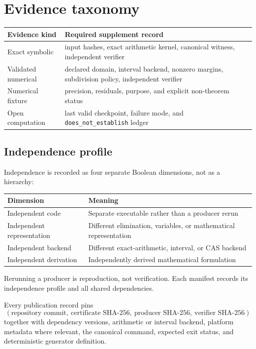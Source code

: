 \documentclass[11pt]{article}
\begin{document}
\section{Evidence taxonomy}

\begin{center}
\begin{tabularx}{0.96\textwidth}{@{}Y Y@{}}
\toprule
Evidence kind & Required supplement record\\
\midrule
Exact symbolic & input hashes, exact arithmetic kernel, canonical witness,
independent verifier\\
Validated numerical & declared domain, interval backend, nonzero margins,
subdivision policy, independent verifier\\
Numerical fixture & precision, residuals, purpose, and explicit
non-theorem status\\
Open computation & last valid checkpoint, failure mode, and
\texttt{does\_not\_establish} ledger\\
\bottomrule
\end{tabularx}
\end{center}

\subsection{Independence profile}

Independence is recorded as four separate Boolean dimensions, not as a
hierarchy:
\begin{center}
\begin{tabularx}{0.96\textwidth}{@{}p{} Y@{}}
\toprule
Dimension & Meaning\\
\midrule
Independent code & Separate executable rather than a producer rerun\\
Independent representation & Different elimination, variables, or
mathematical representation\\
Independent backend & Different exact-arithmetic, interval, or CAS backend\\
Independent derivation & Independently derived mathematical formulation\\
\bottomrule
\end{tabularx}
\end{center}
Rerunning a producer is reproduction, not verification.  Each manifest
records its independence profile and all shared dependencies.

Every publication record pins
\[
(\text{repository commit},\ \text{certificate SHA-256},\
\text{producer SHA-256},\ \text{verifier SHA-256})
\]
together with dependency versions, arithmetic or interval backend,
platform metadata where relevant, the canonical command, expected exit
status, and deterministic generator definition.
\end{document}
